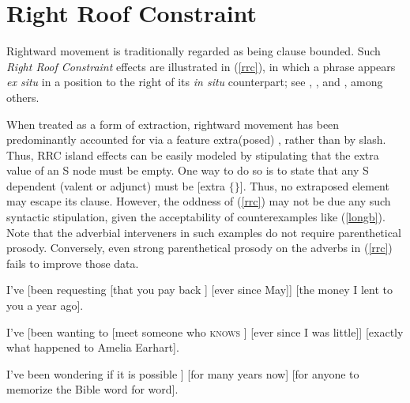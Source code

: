 \documentclass[output=paper
                ,modfonts
                ,nonflat
	        ,collection
	        ,collectionchapter
	        ,collectiontoclongg
 	        ,biblatex
                ,babelshorthands
                ,newtxmath
                ,draftmode
                ,colorlinks, citecolor=brown
]{./langsci/langscibook}
\begin{document}
\section{Right Roof Constraint}

Rightward movement is traditionally regarded as being clause bounded. Such
 \emph{Right Roof Constraint}  \citep{Ross67} effects are illustrated in (\ref{rrc}), 
in which a phrase appears \emph{ex situ} in a position 
to the right of its \emph{in situ} counterpart; see   \citet{akma75}, \citet{baltin78}, and  \citet{stowelldiss}, among others.

\eal \label{rrc}
\zl



\noindent
When treated as a form of extraction, rightward movement has been predominantly
accounted for via a feature {\sc extra(posed)} \citep{Keller95b,Noord:Bouma:96,eynde96,
kellerverb,Mueller99a,KimSag2005}, rather than by {\sc slash}.  
Thus, RRC island effects can be easily modeled by stipulating that the  {\sc extra} value of an S node must be empty. One way to do so is to state that any S dependent (valent or adjunct) must be [{\sc extra} $\lbrace \rbrace$].
Thus, no extraposed element may escape its clause. However,  the oddness of (\ref{rrc}) may not be due any such syntactic stipulation, given the acceptability of counterexamples like (\ref{longb}). Note that the adverbial interveners in such examples do not  require parenthetical prosody. Conversely, even strong  parenthetical
prosody on the adverbs in (\ref{rrc}) fails to improve those data.


\eal \label{longb}
\ex  I've [been requesting [that you pay back \spc] [ever since May]] [the money
I lent to you a year ago].\\
  \citep[251]{kayne00}

\ex I've [been wanting to [meet someone
who \textsc{knows} \spc] [ever since I was little]] [exactly what happened to Amelia Earhart].

\ex  I've been wondering  if it is possible   \spc]
[for many years now] [for anyone to memorize the Bible word for word].\\
\citep[861]{chavesrnr}
\zl
\end{document}
